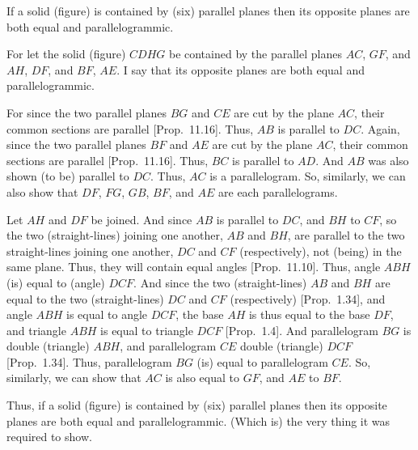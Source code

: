 \begin{Parallel}{}{}
{If a solid (figure) is contained by (six) parallel planes then its opposite planes
are both equal and parallelogrammic.

\epsfysize=1.5in
\centerline{}

For let the solid (figure) $CDHG$ be contained by the parallel planes
$AC$, $GF$, and $AH$, $DF$, and $BF$, $AE$. I say that its opposite
planes are both equal and parallelogrammic.

For since the two parallel planes $BG$ and $CE$ are cut by the plane
$AC$, their common sections are parallel [Prop.~11.16]. Thus, $AB$ is parallel to $DC$.  Again, since
the two parallel planes $BF$ and $AE$ are cut by the plane
$AC$, their common sections are parallel [Prop.~11.16]. Thus,  $BC$ is parallel to $AD$. And
$AB$ was also shown (to be) parallel to $DC$. Thus, $AC$ is a parallelogram. So, similarly, we can also show that $DF$, $FG$, $GB$,
$BF$, and $AE$ are each parallelograms.

Let $AH$ and $DF$ be joined. And since $AB$ is parallel to
$DC$, and $BH$ to $CF$, so the two (straight-lines) joining one another,
$AB$ and $BH$,
are parallel to the two straight-lines joining one another, $DC$ and
$CF$ (respectively), not (being) in the same plane. Thus, they
will contain equal angles [Prop.~11.10]. Thus,
angle $ABH$ (is) equal to (angle) $DCF$. And since the two (straight-lines)
$AB$ and $BH$ are equal to the two (straight-lines) $DC$ and $CF$ (respectively) [Prop.~1.34], and angle $ABH$ is equal to angle $DCF$, the base
$AH$ is thus equal to the base $DF$, and triangle $ABH$ is equal to
triangle $DCF$ [Prop.~1.4]. And parallelogram
$BG$ is double (triangle) $ABH$, and parallelogram $CE$
double (triangle) $DCF$ [Prop.~1.34]. Thus,
parallelogram $BG$ (is) equal to parallelogram $CE$. So, similarly,
we can show that $AC$ is also equal to $GF$, and $AE$ to $BF$.

Thus, if a solid (figure) is contained by (six) parallel planes then its opposite planes
are both equal and parallelogrammic. (Which is) the very thing it was required to
show.}
\end{Parallel}

